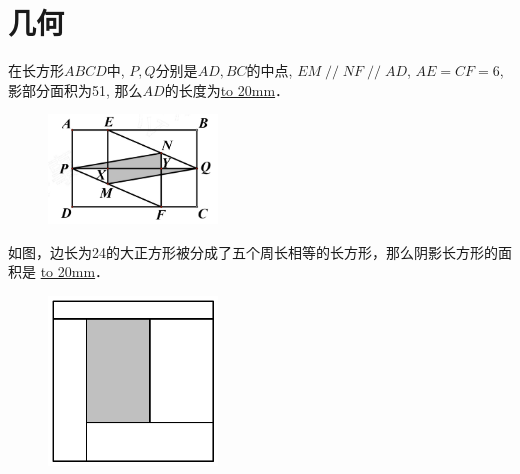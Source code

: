 \section{几何}

\item {
    在长方形$ABCD$中, $P,Q$分别是$AD,BC$的中点, $EM\mathop{//}NF\mathop{//}AD$, $AE=CF=6$,影部分面积为51, 那么$AD$的长度为\underline{\hbox to 20mm{}}．
    \begin{figure}[H] 
        \centering
        \includegraphics[width=0.4\textwidth]{./pics/Chapter_3/1.png}
    \end{figure}
    \vspace{1cm}
}

\item {
    如图，边长为24的大正方形被分成了五个周长相等的长方形，那么阴影长方形的面积是 \underline{\hbox to 20mm{}}．
    \begin{figure}[H] 
        \centering
        \includegraphics[width=0.4\textwidth]{./pics/Chapter_3/2.png}
    \end{figure}
    \vspace{1cm}
}

